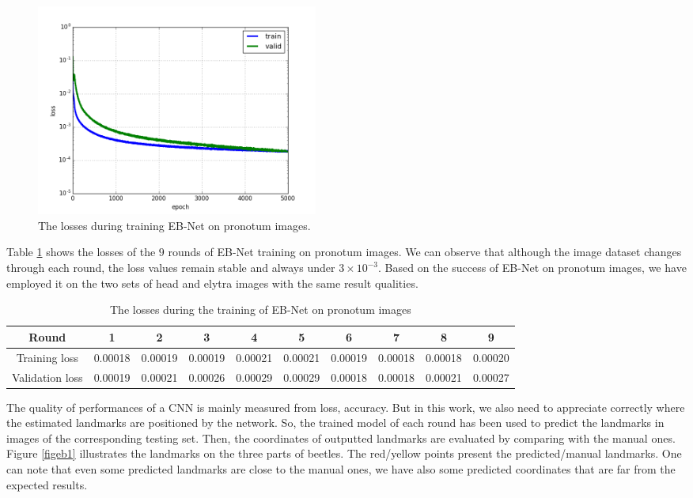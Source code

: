 \documentclass[review]{elsarticle}
\begin{document}
\begin{figure}[h!]
    \centering
	\includegraphics[width=0.45\textwidth]{./images/loss_v16}
    \caption{The losses during training EB-Net on pronotum images.}
    \label{figdlosses}
\end{figure}

Table \ref{tbltrainingloss} shows the losses of the $9$ rounds of EB-Net training on pronotum images. We can observe that although the image dataset changes through each round, the loss values remain stable and always under $3 \times 10^{-3}$. Based on the success of EB-Net on pronotum images, we have employed it on the two sets of head and elytra images with the same result qualities.

\begin{table}[h!]
	\centering
	\begin{tabular}{| c | c | c | c | c | c | c | c | c | c |}
	\hline
	Round & 1 & 2 & 3 & 4 & 5 & 6 & 7 & 8 & 9 \\ \hline
Training loss & 0.00018 & 0.00019 & 0.00019 & 0.00021 & 0.00021 & 0.00019 & 0.00018 & 0.00018 & 0.00020 \\ \hline
Validation loss & 0.00019 & 0.00021 & 0.00026 & 0.00029 & 0.00029 & 0.00018 & 0.00018 & 0.00021 & 0.00027 \\ \hline
	\end{tabular}
	\caption{The losses during the training of EB-Net on pronotum images}
	\label{tbltrainingloss}
\end{table}

The quality of performances of a CNN is mainly measured from loss, accuracy. But in this work, we also need to appreciate correctly where the estimated landmarks are positioned by the network. So, the trained model of each round has been used to predict the landmarks in images of the corresponding testing set. Then, the coordinates of outputted landmarks are evaluated by comparing with the manual ones. Figure \ref{figeb1} illustrates the landmarks on the three parts of beetles. The red/yellow points present the predicted/manual landmarks. One can note that even some predicted landmarks are close to the manual ones, we have also some predicted coordinates that are far from the expected results.
\end{document}
